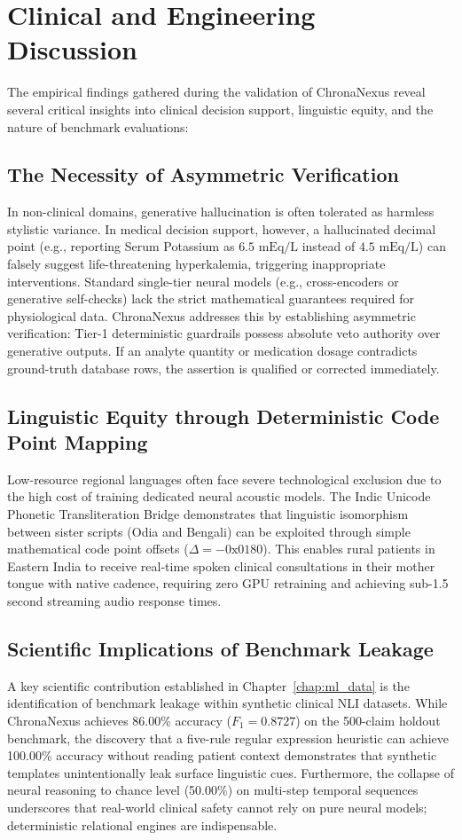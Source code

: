 \section{Clinical and Engineering Discussion}
\label{sec:discussion}

The empirical findings gathered during the validation of ChronaNexus reveal several critical insights into clinical decision support, linguistic equity, and the nature of benchmark evaluations:

\subsection{The Necessity of Asymmetric Verification}
In non-clinical domains, generative hallucination is often tolerated as harmless stylistic variance. In medical decision support, however, a hallucinated decimal point (e.g., reporting Serum Potassium as $6.5\text{ mEq/L}$ instead of $4.5\text{ mEq/L}$) can falsely suggest life-threatening hyperkalemia, triggering inappropriate interventions. Standard single-tier neural models (e.g., cross-encoders or generative self-checks) lack the strict mathematical guarantees required for physiological data. ChronaNexus addresses this by establishing asymmetric verification: Tier-1 deterministic guardrails possess absolute veto authority over generative outputs. If an analyte quantity or medication dosage contradicts ground-truth database rows, the assertion is qualified or corrected immediately.

\subsection{Linguistic Equity through Deterministic Code Point Mapping}
Low-resource regional languages often face severe technological exclusion due to the high cost of training dedicated neural acoustic models. The Indic Unicode Phonetic Transliteration Bridge demonstrates that linguistic isomorphism between sister scripts (Odia and Bengali) can be exploited through simple mathematical code point offsets ($\Delta = -0\text{x}0180$). This enables rural patients in Eastern India to receive real-time spoken clinical consultations in their mother tongue with native cadence, requiring zero GPU retraining and achieving sub-1.5 second streaming audio response times.

\subsection{Scientific Implications of Benchmark Leakage}
A key scientific contribution established in Chapter~\ref{chap:ml_data} is the identification of benchmark leakage within synthetic clinical NLI datasets. While ChronaNexus achieves 86.00\% accuracy ($F_1 = 0.8727$) on the 500-claim holdout benchmark, the discovery that a five-rule regular expression heuristic can achieve 100.00\% accuracy without reading patient context demonstrates that synthetic templates unintentionally leak surface linguistic cues. Furthermore, the collapse of neural reasoning to chance level (50.00\%) on multi-step temporal sequences underscores that real-world clinical safety cannot rely on pure neural models; deterministic relational engines are indispensable.


